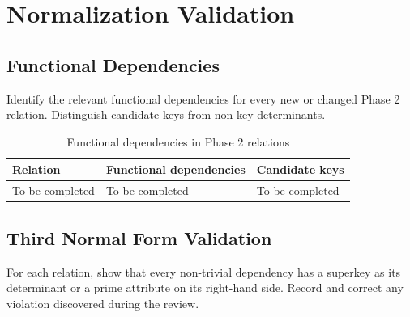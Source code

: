 \section{Normalization Validation}
\label{sec:normalization}

\subsection{Functional Dependencies}
Identify the relevant functional dependencies for every new or changed Phase 2
relation. Distinguish candidate keys from non-key determinants.

\begin{table}[htbp]
    \centering
    \begin{tabularx}{\textwidth}{p{}X X}
        \toprule
        \textbf{Relation} & \textbf{Functional dependencies} & \textbf{Candidate keys} \\
        \midrule
        To be completed & To be completed & To be completed \\
        \bottomrule
    \end{tabularx}
    \caption{Functional dependencies in Phase 2 relations}
    \label{tab:phase2-functional-dependencies}
\end{table}

\subsection{Third Normal Form Validation}
For each relation, show that every non-trivial dependency has a superkey as its
determinant or a prime attribute on its right-hand side. Record and correct any
violation discovered during the review.